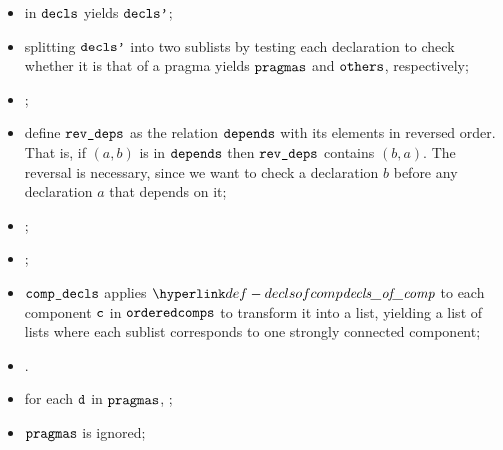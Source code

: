 \ProseParagraph
\AllApply
\begin{itemize}
  \item \Proseoverridesubprograms{} in $\texttt{decls}$ yields $\texttt{decls'}$;
  \item splitting $\texttt{decls'}$ into two sublists by testing each declaration to check whether
        it is that of a pragma yields $\texttt{pragmas}$ and $\texttt{others}$, respectively;
  \item {};
  \item define $\reverseddependencies$ as the relation $\texttt{depends}$ with its elements in reversed order.
        That is, if $(a,b)$ is in $\texttt{depends}$ then $\reverseddependencies$ contains $(b, a)$.
        The reversal is necessary, since we want to check a declaration $b$ before any declaration $a$
        that depends on it;
  \item {};
  \item \Prosetopologicalorderingcomps{$\comps$}{$\reverseddependencies$}{$\orderedcomps$};
  \item $\compdecls$ applies $\declsofcomp$ to each component $\texttt{c}$ in $\orderedcomps$ to transform it into a list,
        yielding a list of lists where each sublist corresponds to one strongly connected component;
  \item \Proseannotatedeclcomps{$\genv$}{$\compdecls$}{$\newdecls$}{$\newtenv$\ProseOrTypeError}.
  \item for each $\vd$ in $\texttt{pragmas}$, \Prosecheckglobalpragma{$\newtenv$}{$\vd$}\ProseOrTypeError;
  \item $\texttt{pragmas}$ is ignored;
\end{itemize}

